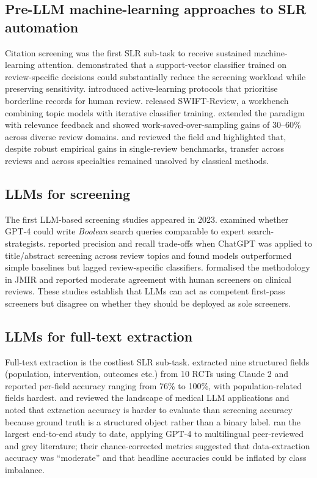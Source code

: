 \documentclass[a4paper,fleqn]{cas-sc}
\begin{document}
\subsection{Pre-LLM machine-learning approaches to SLR automation}

Citation screening was the first SLR sub-task to receive sustained
machine-learning attention. \citet{cohen2006reducing} demonstrated that a
support-vector classifier trained on review-specific decisions could
substantially reduce the screening workload while preserving sensitivity.
\citet{wallace2010active} introduced active-learning protocols that
prioritise borderline records for human review. \citet{howard2016swift}
released SWIFT-Review, a workbench combining topic models with iterative
classifier training. \citet{przybyla2018prioritising} extended the
paradigm with relevance feedback and showed work-saved-over-sampling
gains of 30--60\% across diverse review domains.
\citet{bannach2019machine} and \citet{marshall2019toward} reviewed the
field and highlighted that, despite robust empirical gains in single-review
benchmarks, transfer across reviews and across specialties remained
unsolved by classical methods.

\subsection{LLMs for screening}

The first LLM-based screening studies appeared in 2023.
\citet{wang2023llmscreen} examined whether GPT-4 could write
\emph{Boolean} search queries comparable to expert search-strategists.
\citet{syriani2024screening} reported precision and recall trade-offs
when ChatGPT was applied to title/abstract screening across review topics
and found models outperformed simple baselines but lagged
review-specific classifiers. \citet{guo2024llmsr} formalised the
methodology in JMIR and reported moderate agreement with human screeners on
clinical reviews. These studies establish that LLMs can act as competent
first-pass screeners but disagree on whether they should be deployed as
sole screeners.

\subsection{LLMs for full-text extraction}

Full-text extraction is the costliest SLR sub-task. \citet{gartlehner2024aisr}
extracted nine structured fields (population, intervention, outcomes
etc.) from 10 RCTs using Claude 2 and reported per-field accuracy
ranging from 76\% to 100\%, with population-related fields hardest.
\citet{whitton2025evidence} and \citet{thirunavukarasu2023llmmedicine}
reviewed the landscape of medical LLM applications and noted that
extraction accuracy is harder to evaluate than screening accuracy because
ground truth is a structured object rather than a binary label.
\citet{khraisha2024llmsr} ran the largest end-to-end study to date,
applying GPT-4 to multilingual peer-reviewed and grey literature; their
chance-corrected metrics suggested that data-extraction accuracy was
``moderate'' and that headline accuracies could be inflated by class
imbalance.
\end{document}
